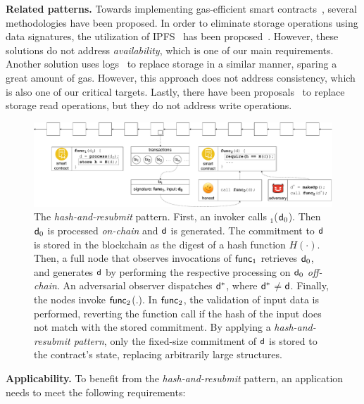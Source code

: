 \noindent \textbf{Related patterns.} Towards implementing gas-efficient smart
contracts~\cite{contract-opt-1,contract-opt-2,slither,madmax}, several
methodologies have been proposed. In order to eliminate storage operations
using data signatures, the utilization of IPFS~\cite{ipfs} has been
proposed~\cite{ipfs-1,ipfs-2}. However, these solutions do not address
\emph{availability}, which is one of our main requirements. Another solution
uses logs~\cite{logs} to replace storage in a similar manner, sparing a great
amount of gas. However, this approach does not address consistency, which is
also one of our critical targets. Lastly, there have been proposals~\cite{memory-array}
to replace storage read operations, but they do not address write operations.


\begin{figure}
    \includegraphics[width=1\textwidth]{figures/har-pattern.pdf}

    \caption{The \emph{hash-and-resubmit} pattern. First, an invoker calls
        \proc$_1$($\mathsf{d}_0$). Then $\mathsf{d}_0$ is processed \emph{on-chain} and
        $\mathsf{d}$ is generated. The commitment to $\mathsf{d}$ is stored in the
        blockchain as the digest of a hash function $H(\cdot)$. Then,
        a full node that observes invocations of $\textsf{func}_1$ retrieves $\mathsf{d}_0$,
        and generates $\mathsf{d}$ by performing the respective processing on
        $\mathsf{d}_0$ \emph{off-chain}. An adversarial observer dispatches
        $\mathsf{d^*}$, where $\mathsf{d^*}$$\neq$$\mathsf{d}$. Finally, the nodes invoke
        $\textsf{func}_2$(.). In $\textsf{func}_2$, the validation of input data is performed,
        reverting the function call if the hash of the input does not
        match with the stored commitment. By applying
        a \emph{hash-and-resubmit pattern}, only the fixed-size commitment of
        $\mathsf{d}$ is stored to the contract's state, replacing arbitrarily large
        structures.}

        \label{fig:har-pattern}
\end{figure}

\noindent
\textbf{Applicability.}
To benefit from the \emph{hash-and-resubmit} pattern, an application needs to
meet the following requirements:

